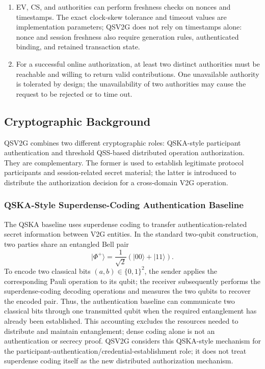 \documentclass[twocolumn,10pt,journal]{IEEEtran}
\begin{document}
\begin{enumerate}[leftmargin=*]
    \item EV, CS, and authorities can perform freshness checks on nonces and timestamps. The exact clock-skew tolerance and timeout values are implementation parameters; QSV2G does not rely on timestamps alone: nonce and session freshness also require generation rules, authenticated binding, and retained transaction state.

    \item For a successful online authorization, at least two distinct authorities must be reachable and willing to return valid contributions. One unavailable authority is tolerated by design; the unavailability of two authorities may cause the request to be rejected or to time out.
\end{enumerate}

\subsection{Cryptographic Background}
QSV2G combines two different cryptographic roles: QSKA-style participant authentication and threshold QSS-based distributed operation authorization. They are complementary. The former is used to establish legitimate protocol participants and session-related secret material; the latter is introduced to distribute the authorization decision for a cross-domain V2G operation.

\subsubsection{QSKA-Style Superdense-Coding Authentication Baseline}
The QSKA baseline \cite{prateek2024qska} uses superdense coding to transfer authentication-related secret information between V2G entities. In the standard two-qubit construction, two parties share an entangled Bell pair~\cite{bennett1992dense}
\begin{equation}
\lvert\Phi^{+}\rangle=\frac{1}{\sqrt{2}}\left(\lvert00\rangle+\lvert11\rangle\right).
\label{eq:bell_pair}
\end{equation}
To encode two classical bits $(a,b)\in\{0,1\}^{2}$, the sender applies the corresponding Pauli operation to its qubit; the receiver subsequently performs the superdense-coding decoding operations and measures the two qubits to recover the encoded pair. Thus, the authentication baseline can communicate two classical bits through one transmitted qubit when the required entanglement has already been established. This accounting excludes the resources needed to distribute and maintain entanglement; dense coding alone is not an authentication or secrecy proof. QSV2G considers this QSKA-style mechanism for the participant-authentication/credential-establishment role; it does not treat superdense coding itself as the new distributed authorization mechanism.
\end{document}
